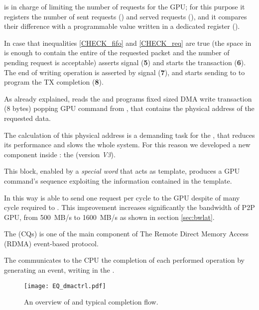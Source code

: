  is in charge of limiting the number of requests for the
GPU; for this purpose it registers the number of sent requests
() and served requests (), and it compares their
difference with a programmable value written in a dedicated register
().



In case that inequalities \ref{CHECK_fifo} and \ref{CHECK_req} are
true (the space in  is enough to contain the entire
\payload of the requested packet and the number of pending request is
acceptable)  asserts  signal
(\textbf{5}) and  starts the transaction
(\textbf{6}).
The end of writing operation is asserted by  signal
(\textbf{7}), and  starts sending  to
 to program the TX completion (\textbf{8}).

As already explained,  reads the  and programs fixed sized DMA write transaction (8 bytes)
popping GPU command from , that contains the
physical address of the requested data.

The calculation of this physical address is a demanding task for the
\nios, that reduces its performance and slows the whole system. For
this reason we developed a new component inside : the  (\ptoptx version \textit{V3}).

This block, enabled by a \nios \emph{special word} that acts as
template, produces a GPU command's sequence exploiting the information
contained in the template.

In this way  is able to send one request per
cycle to the GPU despite of many cycle required to \nios. This
improvement increases significantly the bandwidth of P2P GPU, from
500~MB/s to 1600~MB/s as shown in section \ref{sec:bwlat}.





\label{sec:eventq}
The \CQ (CQs) is one of the main component of The Remote Direct Memory
Access (RDMA) event-based protocol.


The \apenetp communicates to the CPU the completion of each performed
operation by generating an event, \ie writing in the \CQ.


\begin{figure}[!hbt]
  \centering \texttt{[image: EQ\_dmactrl.pdf]}
  \caption{An overview of  and typical
  completion flow.}
  \label{fig:EQ}
\end{figure}

